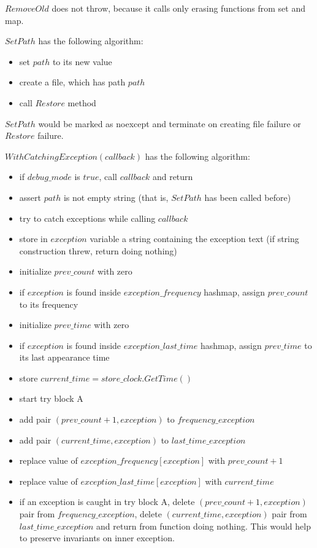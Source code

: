 \documentclass{article}
\begin{document}
$RemoveOld$ does not throw, because it calls only erasing functions from set and map.

$SetPath$ has the following algorithm:
\begin{itemize}
	\item set $path$ to its new value
	\item create a file, which has path $path$
	\item call $Restore$ method
\end{itemize}

$SetPath$ would be marked as noexcept and terminate on creating file failure or $Restore$ failure.

$WithCatchingException(callback)$ has the following algorithm:
\begin{itemize}
	\item if $debug\_mode$ is $true$, call $callback$ and return
	\item assert $path$ is not empty string (that is, $SetPath$ has been called before)
	\item try to catch exceptions while calling $callback$
	\item store in $exception$ variable a string containing the exception text (if string construction threw, return doing nothing)
	\item initialize $prev\_count$ with zero
	\item if $exception$ is found inside $exception\_frequency$ hashmap, assign $prev\_count$ to its frequency
	\item initialize $prev\_time$ with zero
	\item if $exception$ is found inside $exception\_last\_time$ hashmap, assign $prev\_time$ to its last appearance time
	\item store $current\_time = store\_clock.GetTime()$
	\item start try block A
	\item add pair $(prev\_count + 1, exception)$ to $frequency\_exception$
	\item add pair $(current\_time, exception)$ to $last\_time\_exception$
	\item replace value of $exception\_frequency[exception]$ with $prev\_count + 1$
	\item replace value of $exception\_last\_time[exception]$ with $current\_time$
	\item if an exception is caught in try block A, delete  $(prev\_count + 1, exception)$ pair from $frequency\_exception$, delete $(current\_time, exception)$ pair from $last\_time\_exception$ and return from function doing nothing. This would help to preserve invariants on inner exception.

\end{itemize}
\end{document}
